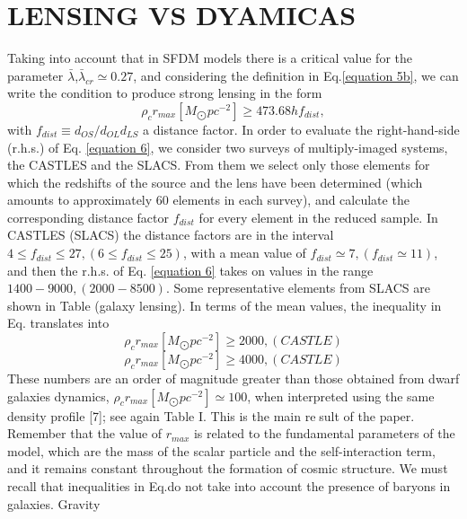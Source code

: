 \documentclass[%
 twocolumn,
 amsmath,amssymb,
 aps,
]{revtex4-2}
\begin{document}
\section{ LENSING VS DYAMICAS}
Taking into account that in SFDM models there is a
critical value for the parameter $\bar{\lambda}$,$\bar{\lambda}_{cr} \simeq 0.27$, and considering the definition in Eq.\ref{equation 5b}, we can write the condition to produce strong lensing in the form
\begin{equation}
    \rho_{c} r_{max}\left [ M_{\bigodot} pc^{-2} \right ]\geq 473.68hf_{dist},
    \label{equation 6}
\end{equation}
with $f_{dist} \equiv d_{OS}/d_{OL}d_{LS}$ a distance factor.
In order to evaluate the right-hand-side (r.h.s.) of
Eq. \ref{equation 6}, we consider two surveys of multiply-imaged systems, the CASTLES and the SLACS. From
them we select only those elements for which the redshifts of the source and the lens have been determined
(which amounts to approximately 60 elements in each
survey), and calculate the corresponding distance factor $f_{dist}$ for every element in the reduced sample. In CASTLES (SLACS) the distance factors are in the interval $4 \leq f_{dist} \leq 27, (6 \leq f_{dist} \leq 25)$, with a mean value
of $f_{dist} \simeq 7, (f_{dist} \simeq 11)$, and then the r.h.s. of Eq. \ref{equation 6}
takes on values in the range $1400-9000,(2000-8500)$.
Some representative elements from SLACS are shown in
Table (galaxy lensing). In terms of the mean values,
the inequality in Eq. translates into
\begin{equation}
     \rho_{c} r_{max}\left [ M_{\bigodot} pc^{-2} \right ]\geq 2000, (CASTLE)
     \label{equation 7a}
\end{equation}
\begin{equation}
     \rho_{c} r_{max}\left [ M_{\bigodot} pc^{-2} \right ]\geq 4000, (CASTLE)
     \label{equation 7b}
\end{equation}
These numbers are an order of magnitude greater
than those obtained from dwarf galaxies dynamics,
$\rho_{c} r_{max}\left [ M_{\bigodot} pc^{-2} \right ] \simeq 100$, when interpreted using the same
density profile [7]; see again Table I. This is the main result of the paper. Remember that the value of $r_{max}$ is related to the fundamental parameters of the model, which are the mass of the scalar particle and the self-interaction
term, and it remains constant throughout the formation
of cosmic structure.
We must recall that inequalities in Eq.do not take
into account the presence of baryons in galaxies. Gravity
\end{document}

